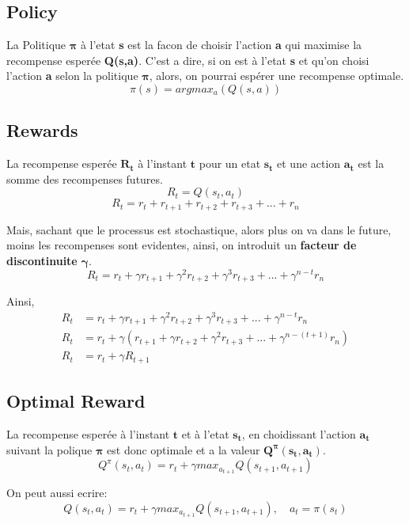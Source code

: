 \documentclass{article}
\begin{document}
\subsection{Policy}

La Politique $\boldsymbol{\pi}$ à l'etat \textbf{s} est la facon de choisir l'action \textbf{a} qui maximise la recompense esperée \textbf{Q(s,a)}. C'est a dire, si on est à l'etat \textbf{s} et qu'on choisi l'action \textbf{a} selon la politique $\boldsymbol{\pi}$, alors, on pourrai espérer une recompense optimale.
$$\pi(s)=argmax_a(Q(s,a))$$

\subsection{Rewards}

La recompense esperée $\boldsymbol{R_t}$ à l'instant $\textbf{t}$ pour un etat $\boldsymbol{s_t}$ et une action $\boldsymbol{a_t}$ est la somme des recompenses futures.
$$R_t=Q(s_t,a_t)$$
$$R_t=r_t+r_{t+1}+r_{t+2}+r_{t+3}+...+r_n$$

Mais, sachant que le processus est stochastique, alors plus on va dans le future, moins les recompenses sont evidentes, ainsi, on introduit un \textbf{facteur de discontinuite} $\boldsymbol{\gamma}$.  
$$R_t=r_t+{\gamma}r_{t+1}+{\gamma^2}r_{t+2}+{\gamma^3}r_{t+3}+...+{\gamma^{n-t}}r_n$$

Ainsi,
\begin{equation}
\begin{split}
R_t&=r_t+{\gamma}r_{t+1}+{\gamma^2}r_{t+2}+{\gamma^3}r_{t+3}+...+{\gamma^{n-t}}r_n \\
R_t&=r_t+{\gamma}(r_{t+1}+{\gamma}r_{t+2}+{\gamma^2}r_{t+3}+...+{\gamma^{n-(t+1)}}r_n) \\
R_t&=r_t+{\gamma}R_{t+1}
\end{split}
\end{equation}

\subsection{Optimal Reward}

La recompense esperée à l'instant $\textbf{t}$ et à l'etat $\boldsymbol{s_t}$, en choidissant l'action $\boldsymbol{a_t}$ suivant la polique $\boldsymbol{\pi}$ est donc optimale et a la valeur $\boldsymbol{Q^{\pi}(s_t,a_t)}$.
$$Q^{\pi}(s_t,a_t)=r_t+{\gamma}max_{a_{t+1}}{Q(s_{t+1},a_{t+1})}$$

On peut aussi ecrire:
$$Q(s_t,a_t)=r_t+{\gamma}max_{a_{t+1}}{Q(s_{t+1},a_{t+1})}, \quad a_t=\pi(s_t)$$
\end{document}
